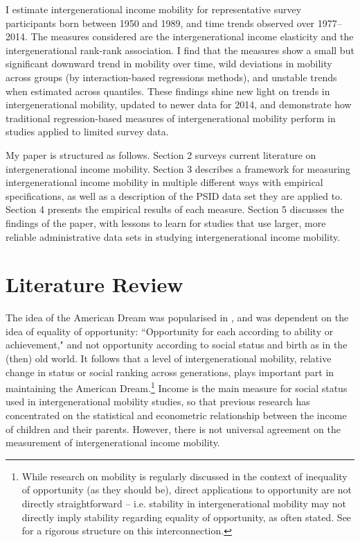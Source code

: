 \documentclass[notitlepage,12pt]{article}
\begin{document}
I estimate intergenerational income mobility for representative survey participants born between 1950 and 1989, and time trends observed over 1977--2014.  The measures considered are the intergenerational income elasticity and the intergenerational rank-rank association.  I find that the measures show a small but significant downward trend in mobility over time, wild deviations in mobility across groups (by interaction-based regressions methods), and unstable trends when estimated across quantiles.  These findings shine new light on trends in intergenerational mobility, updated to newer data for 2014, and demonstrate how traditional regression-based measures of intergenerational mobility perform in studies applied to limited survey data. 

My paper is structured as follows.  Section 2 surveys current literature on intergenerational income mobility.  Section 3 describes a framework for measuring intergenerational income mobility in multiple different ways with empirical specifications, as well as a description of the PSID data set they are applied to.  Section 4 presents the empirical results of each measure.  Section 5 discusses the findings of the paper, with lessons to learn for studies that use larger, more reliable administrative data sets in studying intergenerational income mobility.

\section{Literature Review}
The idea of the American Dream was popularised in \cite{truslow1938epic}, and was dependent on the idea of equality of opportunity: ``Opportunity for each according to ability or achievement," and not opportunity according to social status and birth as in the (then) old world.  It follows that a level of intergenerational mobility, relative change in status or social ranking across generations, plays important part in maintaining the American Dream.\footnote{While research on mobility is regularly discussed in the context of inequality of opportunity (as they should be), direct applications to opportunity are not directly straightforward -- i.e. stability in intergenerational mobility may not directly imply stability regarding equality of opportunity, as often stated.  See \cite{van2001three} for a rigorous structure on this interconnection.}  Income is the main measure for social status used in intergenerational mobility studies, so that previous research has concentrated on the statistical and econometric relationship between the income of children and their parents.  However, there is not universal agreement on the measurement of intergenerational income mobility.
\end{document}
